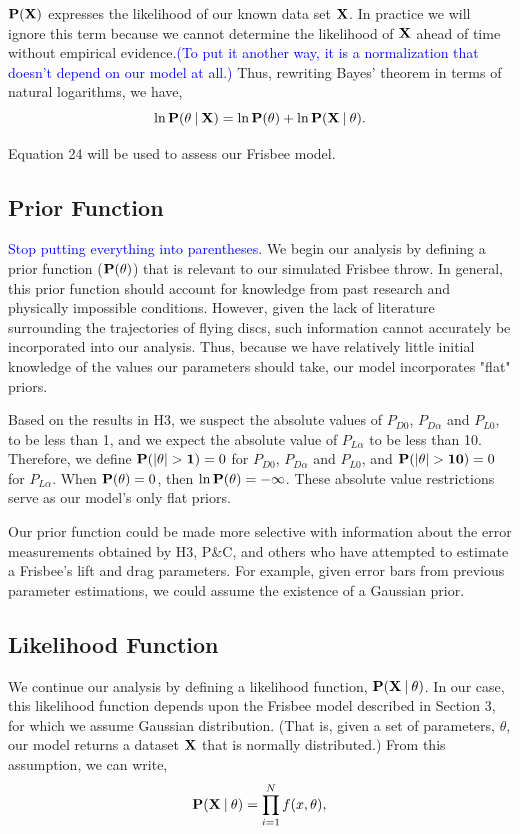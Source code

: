 \documentclass[a4paper,12pt, oneside]{article}
\newcommand{\blue}[1]{\textcolor{blue}{#1}}
\newcommand\givenbase[1][]{\:#1\lvert\:}
\let\given\givenbase
\begin{document}
$\bold{P(\bold{X})}$ expresses the likelihood of our known data set $\bold{X}$. In practice we will ignore this term because we cannot determine the likelihood of $\bold{X}$ ahead of time without empirical evidence.\blue{(To put it another way, it is a normalization that doesn't depend on our model at all.)} Thus, rewriting Bayes' theorem in terms of natural logarithms, we have,
\begin{equation}
\ln\bold{P}(\theta\given\bold{X})=\ln{\bold{P(\theta})+\ln\bold{P({X}\given\theta})}.
\end{equation}

Equation 24 will be used to assess our Frisbee model.
\subsection{Prior Function}
\blue{Stop putting everything into parentheses.}
We begin our analysis by defining a prior function ($\bold{P(\theta)}$) that is relevant to our simulated Frisbee throw. In general, this prior function should account for knowledge from past research and physically impossible conditions. However, given the lack of literature surrounding the trajectories of flying discs, such information cannot accurately be incorporated into our analysis.  Thus, because we have relatively little initial knowledge of the values our parameters should take, our model incorporates "flat" priors. 

Based on the results in H3, we suspect the absolute values of $P_{D0}$, $P_{D\alpha}$ and $P_{L0}$, to be less than 1, and we expect the absolute value of $P_{L\alpha}$ to be less than 10. Therefore, we define $\bold{P(\left|\theta\right|>1)}=0$ for $P_{D0}$, $P_{D\alpha}$ and $P_{L0}$, and $\bold{P(\left|\theta\right|>10)}=0$ for $P_{L\alpha}$. When  $\bold{P(\theta)}=0$, then $\ln\bold{P(\theta)}=-\infty$. These absolute value restrictions serve as our model's only flat priors.

Our prior function could be made more selective with information about the error measurements obtained by H3, P\&C, and others who have attempted to estimate a Frisbee's lift and drag parameters. For example, given error bars from previous parameter estimations, we could assume the existence of a Gaussian prior. 
\subsection{Likelihood Function}

We continue our analysis by defining a likelihood function, $\bold{P({X}\given\theta})$. In our case, this likelihood function depends upon the Frisbee model described in Section 3, for which we assume Gaussian distribution. (That is, given a set of parameters, $\theta$, our model returns a dataset $\bold{X}$ that is normally distributed.) From this assumption, we can write, 
\begin{equation}
\bold{P({X}\given\theta)}={\prod_{i=1}^{N} f(x,\theta)},
\end{equation}
\end{document}
